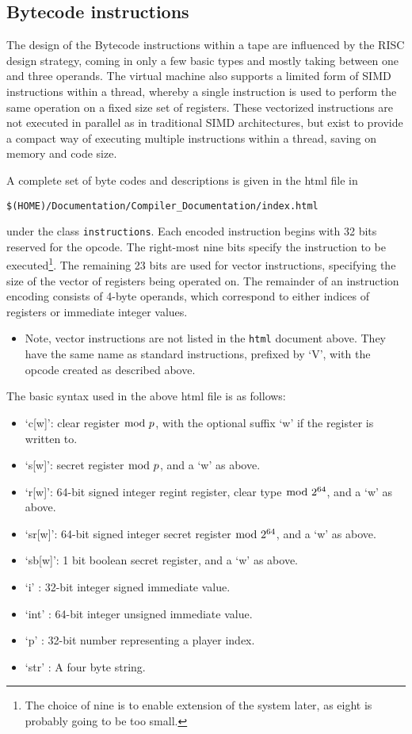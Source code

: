\subsection{Bytecode instructions}

The design of the Bytecode instructions within a tape are influenced
by the RISC design strategy, coming in only a few basic
types and mostly taking between one and three
operands. The virtual machine also supports a limited form of
SIMD instructions within a thread, whereby a single instruction is used to
perform the same operation on a fixed size set of registers.
These vectorized instructions are not executed in parallel
as in traditional SIMD architectures, but exist to provide a compact way of
executing multiple instructions within a thread, saving on memory
and code size.

A complete set of byte codes and descriptions is
given in the html file in 
\begin{center}
   \verb+$(HOME)/Documentation/Compiler_Documentation/index.html+
\end{center}
under the class \verb+instructions+.
Each encoded instruction begins with 32 bits reserved for the opcode.
The right-most nine bits specify the instruction to be executed\footnote{The choice of nine is to enable extension of the system later, as eight is probably going 
to be too small.}.
The remaining 23 bits are used for vector instructions, specifying the
size of the vector of registers being operated on.
The remainder of an instruction encoding consists of 4-byte operands, which
correspond to either indices of registers or immediate integer values.
\begin{itemize}
\item Note, vector instructions are not listed in the \verb+html+ document above.
They have the same name as standard instructions, prefixed by `V',
with the opcode created as described above.
\end{itemize}
The basic syntax used in the above html file is as follows:
\begin{itemize}
\item `c[w]': clear register $\bmod \; p$, with the optional suffix `w' if the register is
written to.
\item `s[w]': secret register $\bmod \; p$, and a `w' as above.
\item `r[w]': 64-bit signed integer regint register, clear type $\bmod \; 2^{64}$, and a `w' as above.
\item `sr[w]': 64-bit signed integer secret register $\bmod \; 2^{64}$, and a `w' as above.
\item `sb[w]': 1 bit boolean secret register, and a `w' as above.
\item `i'   : 32-bit integer signed immediate value.
\item `int' : 64-bit integer unsigned immediate value.
\item `p'   : 32-bit number representing a player index.
\item `str' : A four byte string.


\end{itemize}


